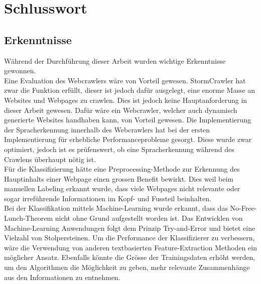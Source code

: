 \chapter{Schlusswort}
\section{Erkenntnisse}
Während der Durchführung dieser Arbeit wurden wichtige Erkenntnisse gewonnen.\\
Eine Evaluation des Webcrawlers wäre von Vorteil gewesen.
StormCrawler hat zwar die Funktion erfüllt, dieser ist jedoch dafür ausgelegt, eine enorme Masse an Websites und Webpages zu crawlen.
Dies ist jedoch keine Hauptanforderung in dieser Arbeit gewesen.
Dafür wäre ein Webcrawler, welcher auch dynamisch generierte Websites handhaben kann, von Vorteil gewesen.
Die Implementierung der Spracherkennung innerhalb des Webcrawlers hat bei der ersten Implementierung für erhebliche Performanceprobleme gesorgt.
Diese wurde zwar optimiert, jedoch ist es prüfenswert, ob eine Spracherkennung während des Crawlens überhaupt nötig ist.\\
Für die Klassifizierung hätte eine Preprocessing-Methode zur Erkennung des Hauptinhalts einer Webpage einen grossen Benefit bewirkt.
Dies weil beim manuellen Labeling erkannt wurde, dass viele Webpages nicht relevante oder sogar irreführende Informationen im Kopf- und Fussteil beinhalten.\\
Bei der Klassifikation mittels Machine-Learning wurde erkannt, dass das \glqq No-Free-Lunch\grqq{}-Theorem nicht ohne Grund aufgestellt worden ist.
Das Entwicklen von Machine-Learning Anwendungen folgt dem Prinzip \glqq Try-and-Error\grqq{} und bietet eine Vielzahl von Stolpersteinen.
Um die Performance der Klassifizierer zu verbessern, wäre die Verwendung von anderen textbasierten Feature-Extraction Methoden ein möglicher Ansatz.
Ebenfalls könnte die Grösse der Trainingsdaten erhöht werden, um den Algorithmen die Möglichkeit zu geben, mehr relevante Zusammenhänge aus den Informationen zu entnehmen.
